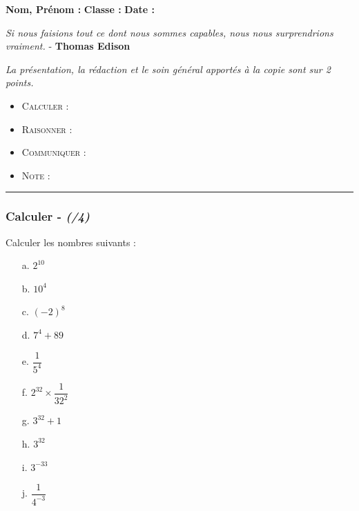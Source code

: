 \documentclass[11pt]{article}
\newcommand{\horrule}[1]{\rule{\linewidth}{#1}} %
\begin{document}
\textbf{Nom, Prénom :} \hspace{8cm} \textbf{Classe :} \hspace{3cm} \textbf{Date :}\\


\begin{center}
  \textit{Si nous faisions tout ce dont nous sommes capables, nous nous surprendrions vraiment.}  - \textbf{Thomas Edison}
\end{center}

\textit{La présentation, la rédaction et le soin général apportés à la copie sont sur 2 points.}
\begin{itemize}
\item \textsc{Calculer} : 
\item \textsc{Raisonner} : 
\item \textsc{Communiquer} : 
\item \textsc{Note} : 
\end{itemize}

\horrule{1px}
\vspace{-1cm}

\subsubsection*{Calculer - \textit{(/4)}}
\begin{multicols}{2}
Calculer les nombres suivants :\\
\begin{enumerate}
  \item[a.] $ 2^{10} $
  \item[b.] $ 10^4 $ 
  \item[c.] $ (-2)^8 $
  \item[d.] $ 7^4 + 89 $
  \item[e.] $ \dfrac{1}{5^4} $
  \item[f.] $ 2^{32} \times \dfrac{1}{32^2} $
  \item[g.] $ 3^{32} + 1$
  \item[h.] $ 3^{32}$
  \item[i.] $ 3^{-33}$
  \item[j.] $ \dfrac{1}{4^{-3}}$
\end{enumerate}
\end{multicols}
\end{document}
